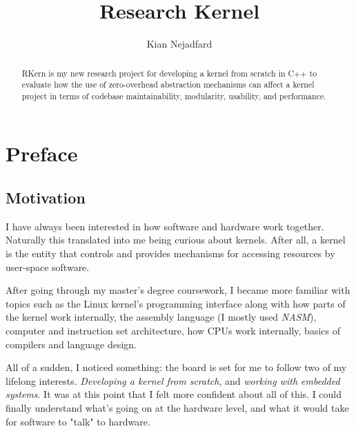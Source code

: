 \documentclass[a4paper,12pt,twoside]{report}
\title{Research Kernel}
\author{Kian Nejadfard}
\begin{document}
    \maketitle
    
    \begin{abstract}
    	RKern is my new research project for developing a kernel from scratch in C++ to evaluate how the use of zero-overhead abstraction mechanisms can affect a kernel project in terms of codebase maintainability, modularity, usability, and performance.
    \end{abstract}

	\chapter{Preface}
    
	    \section{Motivation}
	    	I have always been interested in how software and hardware work together. Naturally this translated into me being curious about kernels. After all, a kernel is the entity that controls and provides mechanisms for accessing resources by user-space software.
	    	
	    	After going through my master's degree coursework, I became more familiar with topics such as the Linux kernel's programming interface along with how parts of the kernel work internally, the assembly language (I mostly used \textit{NASM}), computer and instruction set architecture, how CPUs work internally, basics of compilers and language design.
	    	
	    	All of a sudden, I noticed something: the board is set for me to follow two of my lifelong interests. \textit{Developing a kernel from scratch}, and \textit{working with embedded systems}.
	    	It was at this point that I felt more confident about all of this. I could finally understand what's going on at the hardware level, and what it would take for software to "talk" to hardware.
	    
\end{document}
